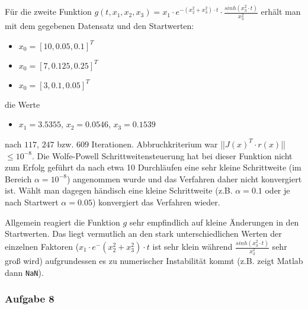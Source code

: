 \documentclass[a4paper, 12pt]{report}
\begin{document}
Für die zweite Funktion $g(t, x_1, x_2, x_3) = x_1 \cdot e^{ -(x_2^2 + x_3^2)\cdot t }\cdot \frac{sinh(x_3^2\cdot t)}{x_3^2}$
erhält man mit dem gegebenen Datensatz und den Startwerten:
\begin{itemize}
  \item $x_0 = [10, 0.05, 0.1]^T$
  \item $x_0 = [7, 0.125, 0.25]^T$
  \item $x_0 = [3, 0.1, 0.05]^T$
\end{itemize}
die Werte
\begin{itemize}
  \item $x_1 = 3.5355$, $x_2 = 0.0546$, $x_3 = 0.1539$
\end{itemize}
nach $117$, $247$ bzw. $609$ Iterationen. Abbruchkriterium war ||$J(x)^T\cdot r(x)$|| $ \leq 10^{-8}$. Die Wolfe-Powell
Schrittweitensteuerung hat bei dieser Funktion nicht zum Erfolg geführt da nach etwa 10 Durchläufen eine sehr kleine
Schrittweite (im Bereich $\alpha = 10^{-8}$) angenommen wurde und das Verfahren daher nicht konvergiert ist. Wählt
man dagegen händisch eine kleine Schrittweite (z.B. $\alpha = 0.1$ oder je nach Startwert $\alpha = 0.05$) konvergiert das
Verfahren wieder.\par
Allgemein reagiert die Funktion $g$ sehr empfindlich auf kleine Änderungen in den Startwerten. Das liegt vermutlich an den
stark unterschiedlichen Werten der einzelnen Faktoren ($x_1\cdot e^-{ (x_2^2 + x_3^2)\cdot t}$ ist sehr klein während
$\frac{sinh(x_3^2\cdot t)}{x_3^2}$ sehr groß wird) aufgrundessen es zu numerischer Instabilität kommt (z.B. zeigt Matlab
dann \lstinline[basicstyle=\ttfamily\color{black}]|NaN|).


\subsubsection{Aufgabe 8}
\end{document}
